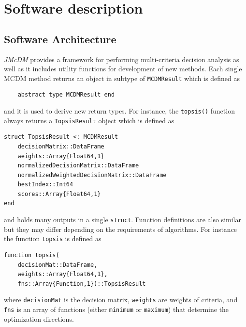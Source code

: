 \documentclass[authoryear,preprint,review,12pt]{elsarticle}
\begin{document}
\section{Software description}
\label{}






\subsection{Software Architecture}
\label{}
\emph{JMcDM} provides a framework for performing multi-criteria decision analysis as well as it includes utility functions for development of new methods. Each single MCDM method returns an object in subtype of \texttt{MCDMResult} which is defined as 

\begin{verbatim}
	abstract type MCDMResult end
\end{verbatim}

\noindent and it is used to derive new return types. For instance, the \texttt{topsis()} function always returns a \texttt{TopsisResult} object which is defined as 

\begin{verbatim}
struct TopsisResult <: MCDMResult
    decisionMatrix::DataFrame
    weights::Array{Float64,1}
    normalizedDecisionMatrix::DataFrame
    normalizedWeightedDecisionMatrix::DataFrame 
    bestIndex::Int64 
    scores::Array{Float64,1}
end
\end{verbatim}

\noindent and holds many outputs in a single \texttt{struct}. Function definitions are also similar but they may differ depending on the requirements of algorithms. For instance the function \texttt{topsis} is defined as

\begin{verbatim}
function topsis(
    decisionMat::DataFrame, 
    weights::Array{Float64,1}, 
    fns::Array{Function,1})::TopsisResult
\end{verbatim} 

\noindent where \texttt{decisionMat} is the decision matrix, \texttt{weights} are weights of criteria, and \texttt{fns} is an array of functions (either \texttt{minimum} or \texttt{maximum}) that determine the optimization directions. 
\end{document}
